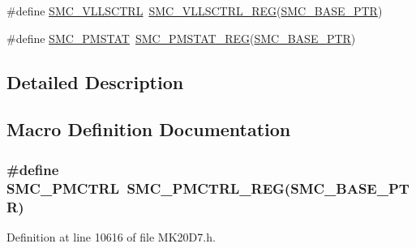 \begin{DoxyCompactItemize}
\item 
\#define \hyperlink{group___s_m_c___register___accessor___macros_gabc1de81f94174f2aaebdc6a51b782fee}{S\+M\+C\+\_\+\+V\+L\+L\+S\+C\+T\+RL}~\hyperlink{group___s_m_c___register___accessor___macros_gaf9878592b3a3adba21106dca7ad03a45}{S\+M\+C\+\_\+\+V\+L\+L\+S\+C\+T\+R\+L\+\_\+\+R\+EG}(\hyperlink{group___s_m_c___peripheral_ga31b6c4571795341e6446800243313e56}{S\+M\+C\+\_\+\+B\+A\+S\+E\+\_\+\+P\+TR})
\item 
\#define \hyperlink{group___s_m_c___register___accessor___macros_ga6311e0572e3a1f7d84e1069716b64307}{S\+M\+C\+\_\+\+P\+M\+S\+T\+AT}~\hyperlink{group___s_m_c___register___accessor___macros_ga77ded725e1d8ccc2781a0ee6dffc8809}{S\+M\+C\+\_\+\+P\+M\+S\+T\+A\+T\+\_\+\+R\+EG}(\hyperlink{group___s_m_c___peripheral_ga31b6c4571795341e6446800243313e56}{S\+M\+C\+\_\+\+B\+A\+S\+E\+\_\+\+P\+TR})
\end{DoxyCompactItemize}


\subsection{Detailed Description}


\subsection{Macro Definition Documentation}
\subsubsection[{\texorpdfstring{S\+M\+C\+\_\+\+P\+M\+C\+T\+RL}{SMC_PMCTRL}}]{\setlength{\rightskip}{0pt plus 5cm}\#define S\+M\+C\+\_\+\+P\+M\+C\+T\+RL~{\bf S\+M\+C\+\_\+\+P\+M\+C\+T\+R\+L\+\_\+\+R\+EG}({\bf S\+M\+C\+\_\+\+B\+A\+S\+E\+\_\+\+P\+TR})}\hypertarget{group___s_m_c___register___accessor___macros_ga4b2bae0309aecee21e9fe70ac7dbe3dc}{}\label{group___s_m_c___register___accessor___macros_ga4b2bae0309aecee21e9fe70ac7dbe3dc}


Definition at line 10616 of file M\+K20\+D7.\+h.

